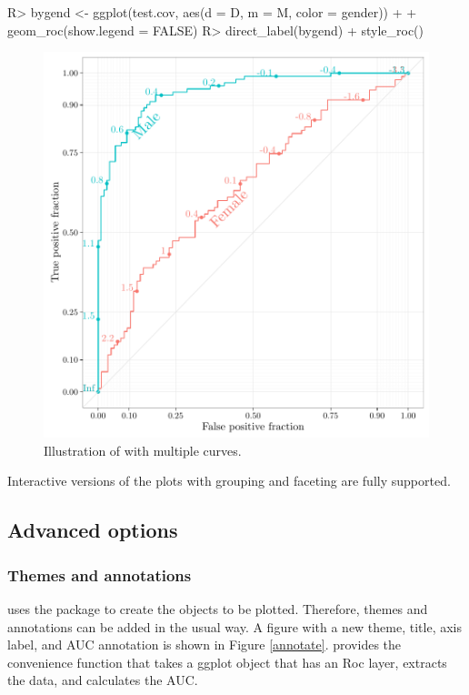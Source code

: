 \documentclass[codesnippet]{jss}
\begin{document}
\begin{Schunk}
\begin{Sinput}
R> bygend <- ggplot(test.cov, aes(d = D, m = M, color = gender)) + 
+   geom_roc(show.legend = FALSE)
R> direct_label(bygend) + style_roc()
\end{Sinput}
\begin{figure}
\includegraphics{figure/covplot-1} \caption{Illustration of  with multiple curves. \label{multi}}\label{fig:covplot}
\end{figure}
\end{Schunk}

Interactive versions of the plots with grouping and faceting are fully
supported.

\subsection{Advanced options}\label{advanced-options}

\subsubsection{Themes and annotations}\label{themes-and-annotations}

 uses the  package to create the objects to be
plotted. Therefore, themes and annotations can be added in the usual
 way. A figure with a new theme, title, axis label, and AUC
annotation is shown in Figure \ref{annotate}.  provides the
convenience function  that takes a ggplot object that has
an Roc layer, extracts the data, and calculates the AUC.
\end{document}
